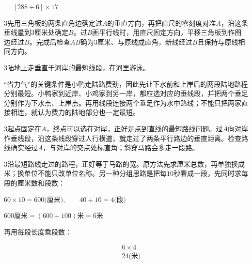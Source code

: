 \documentclass[multi=snippet,border={5bp 20bp 5bp 5bp}]{standalone}
\newenvironment{snippet}[3]{\begin{minipage}{#1bp}\color{answerred}\fontsize{#2}{#3}\selectfont\raggedright}{\end{minipage}}
\begin{document}
\begin{snippet}{82.1055847167969}{10}{12.8}\SourceSans\setlength{\mathindent}{2bp}\(\displaystyle=[288\div6]\times17\)\end{snippet}
\begin{snippet}{505}{11.5}{14}\begin{multicols}{3}\raggedcolumns 先用三角板的两条直角边确定过\(A\)\allowbreak 的垂直方向，再把直尺的零刻度对准\(A\)\allowbreak ，沿这条垂线量到\(3\)\allowbreak 厘米处确定\(B\)\allowbreak 。过\(B\)\allowbreak 画平行线时，用直尺固定方向，平移三角板到作图边经过\(B\)\allowbreak 。完成后检查\(AB\)\allowbreak 确为\(3\)\allowbreak 厘米、与原线成直角，新线经过\(B\)\allowbreak 且保持与原线相同方向。\end{multicols}\end{snippet}
\begin{snippet}{505}{11.5}{14}\begin{multicols}{3}\raggedcolumns 陆地上走垂直于河岸的最短线段，在河里游泳。\par “省力气”的关键条件是小鸭走陆路费劲，因此先让下水前和上岸后的两段陆地路程分别最短。小鸭家到近岸、小鸡家到另一岸，都应选对应的垂线段，并把两个垂足分别作为下水点、上岸点。再用线段连接两个垂足作为水中路线；不能只把两家直接相连，就认为费力的陆地部分也一定最短。\end{multicols}\end{snippet}
\begin{snippet}{505}{11.5}{14}\begin{multicols}{3}\raggedcolumns 起点固定在\(A\)\allowbreak ，终点可以选在对岸，正好是点到直线的最短路线问题。过\(A\)\allowbreak 向对岸作垂线段，沿这条线段穿过人行横道，就走过了两条平行路边的垂直距离。检查路线确实经过\(A\)\allowbreak ，与对岸的交点处标直角；斜穿马路会多走一段路。\end{multicols}\end{snippet}
\begin{snippet}{505}{11.5}{14}\begin{multicols}{3}\raggedcolumns 沿最短路线走过的路程，正好等于马路的宽。原方法先求厘米总数，再单独换成米；换单位不能只改单位名称。另一种分组思路是把每\(10\)\allowbreak 秒看成一段，先同时求每段的厘米数和段数：\par\noindent\(\displaystyle 60\times10=600\text{(厘米)},\allowbreak \qquad40\div10=4\text{(段)}\)\allowbreak \par \noindent\(\displaystyle 600\text{厘米}=(600\div100)\text{米}=6\text{米}\)\allowbreak \par 再用每段长度乘段数：\par\noindent\[\displaystyle \begin{aligned}&6\times4\\={}&24\text{(米)}\end{aligned}\]\par\end{multicols}\end{snippet}
\end{document}
